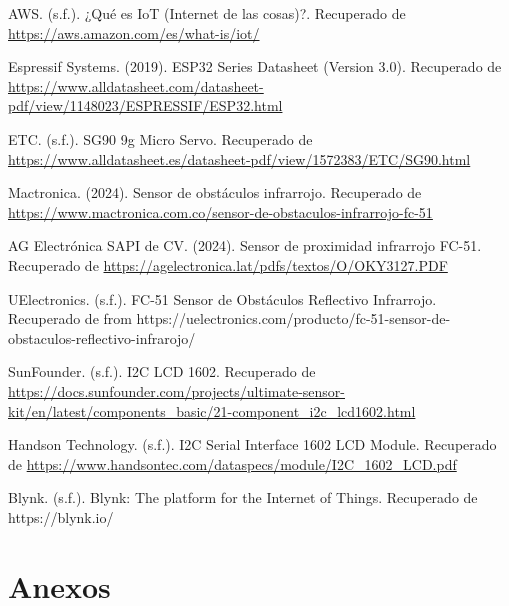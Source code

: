 \documentclass[12pt,a4paper]{article}
\begin{document}
\begin{thebibliography}{9}

AWS. (s.f.). ¿Qué es IoT (Internet de las cosas)?. Recuperado de \url{https://aws.amazon.com/es/what-is/iot/}

Espressif Systems. (2019). ESP32 Series Datasheet (Version 3.0). Recuperado de \url{https://www.alldatasheet.com/datasheet-pdf/view/1148023/ESPRESSIF/ESP32.html}

ETC. (s.f.). SG90 9g Micro Servo. Recuperado de \url{https://www.alldatasheet.es/datasheet-pdf/view/1572383/ETC/SG90.html}

Mactronica. (2024). Sensor de obstáculos infrarrojo. Recuperado de \url{https://www.mactronica.com.co/sensor-de-obstaculos-infrarrojo-fc-51}

AG Electrónica SAPI de CV. (2024). Sensor de proximidad infrarrojo FC-51. Recuperado de \url{https://agelectronica.lat/pdfs/textos/O/OKY3127.PDF}

 UElectronics. (s.f.). FC-51 Sensor de Obstáculos Reflectivo Infrarrojo. Recuperado de  from https://uelectronics.com/producto/fc-51-sensor-de-obstaculos-reflectivo-infrarojo/


SunFounder. (s.f.). I2C LCD 1602. Recuperado de \url{https://docs.sunfounder.com/projects/ultimate-sensor-kit/en/latest/components_basic/21-component_i2c_lcd1602.html}

Handson Technology. (s.f.). I2C Serial Interface 1602 LCD Module. Recuperado de \url{https://www.handsontec.com/dataspecs/module/I2C_1602_LCD.pdf}


 Blynk. (s.f.). Blynk: The platform for the Internet of Things. Recuperado de https://blynk.io/


\end{thebibliography}





\section{Anexos}





\end{document}
